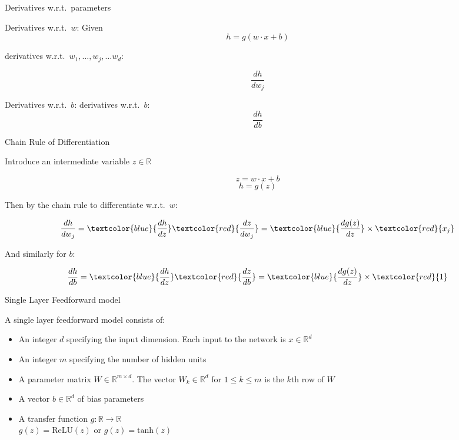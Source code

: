 \begin{frame}{Derivatives w.r.t.\ parameters}
\begin{block}{Derivatives w.r.t.\ $w$:}
Given 
\[ h = g(w \cdot x + b) \]

derivatives w.r.t.\ $w_1, \ldots, w_j, \ldots w_d$:

\[ \frac{dh}{dw_j} \]
\end{block}

\pause
\begin{block}{Derivatives w.r.t.\ $b$:}
derivatives w.r.t.\ $b$:
\[ \frac{dh}{db} \]
\end{block}
\end{frame}


\begin{frame}{Chain Rule of Differentiation}
\begin{block}{Introduce an intermediate variable $z \in \mathbb{R}$}

\[ z = w \cdot x + b \]
\[ h = g(z) \]

Then by the chain rule to differentiate w.r.t.\ $w$:

\[ \frac{dh}{dw_j} = \textcolor{blue}{\frac{dh}{dz}} \textcolor{red}{\frac{dz}{dw_j}} = \textcolor{blue}{\frac{dg(z)}{dz}} \times \textcolor{red}{x_j}\]

\pause
And similarly for $b$:

\[ \frac{dh}{db} = \textcolor{blue}{\frac{dh}{dz}} \textcolor{red}{\frac{dz}{db}}= \textcolor{blue}{\frac{dg(z)}{dz}} \times \textcolor{red}{1}\]

\end{block}
\end{frame}

\begin{frame}{Single Layer Feedforward model}
\begin{block}{A single layer feedforward model consists of:}
\begin{itemize}[<+->]
\item An integer $d$ specifying the input dimension. Each input to the network is $x \in \mathbb{R}^d$
\item An integer $m$ specifying the number of hidden units
\item A parameter matrix $W \in \mathbb{R}^{m \times d}$. The vector $W_k \in \mathbb{R}^d$ for $1 \leq k \leq m$ is the $k$th row of $W$
\item A vector $b \in \mathbb{R}^d$ of bias parameters
\item A transfer function $g : \mathbb{R} \rightarrow \mathbb{R}$\\
$g(z) = \textrm{ReLU}(z)$ or $g(z) = \textrm{tanh}(z)$
\end{itemize}
\end{block}
\end{frame}

